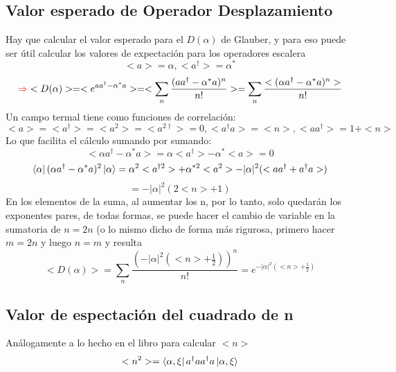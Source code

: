 \documentclass{book}
\begin{document}
       \subsection{Valor esperado de Operador Desplazamiento} Hay que calcular el valor esperado para el ${D(\alpha)}$ de Glauber, y para eso puede ser útil calcular los valores de expectación para los operadores escalera
       \begin{equation}{ <a>=\alpha, <a^{\dag}>=\alpha^*} \end{equation}
   \begin{equation}{\textcolor{red}{\Rightarrow} <D(\alpha)>=<e^{aa^{\dag}-\alpha^*a}>=<\sum_n\frac{(aa^{\dag}-\alpha^*a)^n}{n!}>=\sum_n\frac{<(\alpha a^{\dag}-\alpha^* a)^n>}{n!}} \end{equation}
      Un campo termal tiene como funciones de correlación: \begin{equation}{ <a>=<a^\dag>=<a^2>=<a^{2\dag}>=0, <a^\dag a>=<n>, <aa^\dag>=1+<n>} \end{equation}
      Lo que facilita el cálculo sumando por sumando: 
      \begin{equation}{ <\alpha a^\dag-\alpha^*a>= \alpha<a^\dag>-\alpha^*<a>=0} \end{equation}
      \begin{equation}{\bra{\alpha}(\alpha a^\dag-\alpha^* a)^2\ket{\alpha}=\alpha^2<a^{\dag 2}>+\alpha^{*2}<a^2>-\lvert\alpha\rvert^2(<aa^\dag+a^\dag a>)} \end{equation} \begin{equation}{=-\lvert\alpha\rvert^2(2<n>+1)} \end{equation}
      En los elementos de la suma, al aumentar los n, por lo tanto, solo quedarán los exponentes pares, de todas formas, se puede hacer el cambio de variable en la sumatoria de ${n=2n}$ (o lo mismo dicho de forma más rigurosa, primero hacer ${m=2n}$ y luego ${n=m}$ y resulta \begin{equation}{ <D(\alpha)>=\sum_n \frac{(-\lvert\alpha\rvert^2(<n>+\frac{1}{2}))^n}{n!}=e^{-\lvert\alpha\rvert^2(<n>+\frac{1}{2})} }\end{equation}
   \subsection{Valor de espectación del cuadrado de n} Análogamente a lo hecho en el libro para calcular ${<n>}$ \begin{equation}{<n^2>=\bra{\alpha,\xi}a^\dag a a^\dag a\ket{\alpha,\xi}} \end{equation}
\end{document}
